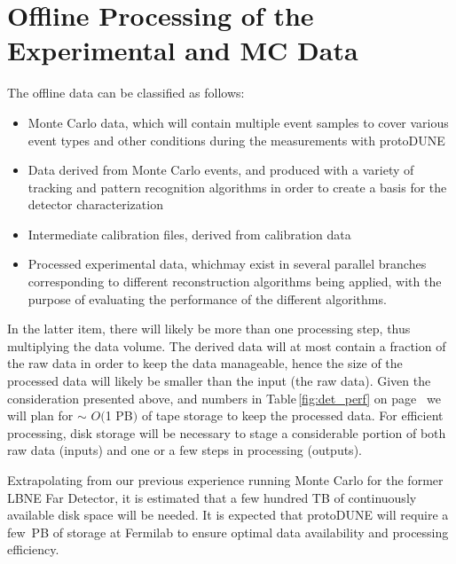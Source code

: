 \section{Offline Processing of the Experimental and MC Data}

The offline data can be classified as follows:
\begin{itemize}
\item Monte Carlo data, which will contain multiple event samples to cover various event types and other conditions during the measurements
with protoDUNE

\item Data derived from Monte Carlo events, and produced with a variety of tracking and pattern recognition algorithms
in order to create a basis for the detector characterization

\item Intermediate calibration files, derived from calibration data

\item Processed experimental data, whichmay exist in several parallel branches corresponding to different reconstruction
algorithms being applied, with the purpose of evaluating the performance of the different algorithms.
\end{itemize}

\noindent In the latter item, there will likely be more than one processing step, thus multiplying the data volume. 
The derived data will at most contain a fraction of the raw data in order to keep the data manageable,
hence the size of the processed data will likely be smaller than the input (the raw data). 
Given the consideration presented above, and numbers in Table\,\ref{fig:det_perf}
on page~\pageref{fig:det_perf} we will plan for
$\sim$ $O($1 PB$)$ of tape storage to keep the processed data. 
For efficient processing, disk storage will be necessary
to stage a considerable portion of both raw data (inputs) and one or a few steps in processing (outputs).

Extrapolating from our previous experience running Monte Carlo for the former LBNE Far Detector, it is estimated
that  a few hundred TB of continuously available disk space will be needed. It is expected that protoDUNE will require
a few~PB of storage at Fermilab to ensure optimal data availability and  processing efficiency. 
